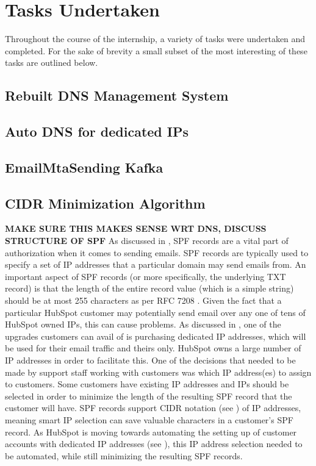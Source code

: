 \chapter{Tasks Undertaken}
Throughout the course of the internship, a variety of tasks were undertaken and completed.  
For the sake of brevity a small subset of the most interesting of these tasks are outlined below. 

\section{Rebuilt DNS Management System}

\section{Auto DNS for dedicated IPs} \label{sec:autoDns}

\section{EmailMtaSending Kafka}

\section{CIDR Minimization Algorithm}
\textbf{MAKE SURE THIS MAKES SENSE WRT DNS, DISCUSS STRUCTURE OF SPF}\hfill\break
As discussed in , SPF records are a vital part of authorization when it comes to sending emails. SPF records are typically used to specify a set of IP addresses that a particular domain may send emails from. An important aspect of SPF records (or more specifically, the underlying TXT record) is that the length of the entire record value (which is a simple string) should be at most 255 characters as per RFC 7208 \cite{spfRFC}. Given the fact that a particular HubSpot customer may potentially send email over any one of tens of HubSpot owned IPs, this can cause problems. As discussed in , one of the upgrades customers can avail of is purchasing dedicated IP addresses, which will be used for their email traffic and theirs only. HubSpot owns a large number of IP addresses in order to facilitate this. One of the decisions that needed to be made by support staff working with customers was which IP address(es) to assign to customers. Some customers have existing IP addresses and IPs should be selected in order to minimize the length of the resulting SPF record that the customer will have. SPF records support CIDR notation (see ) of IP addresses, meaning smart IP selection can save valuable characters in a customer's SPF record. As HubSpot is moving towards automating the setting up of customer accounts with dedicated IP addresses (see ), this IP address selection needed to be automated, while still minimizing the resulting SPF records.

